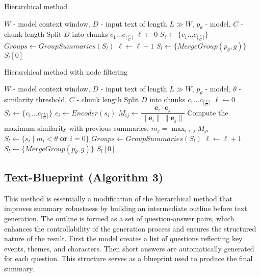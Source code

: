 \documentclass{superfri}
\begin{document}
\noindent
\begin{minipage}[t]{0.49\textwidth}
  \begin{algorithm}[H]
  \caption{Hierarchical method}\label{alg:h}
    \begin{algorithmic}
      \Require $W$ - model context window, $D$ - input text of length $L \gg W$, $p_\theta$ - model, $C$ - chunk length
      \State Split $D$ into chunks $c_1\dots c_{\lceil \frac{L}{C} \rceil}$
      \State $\ell \gets 0$
      \State $S_\ell \gets \{c_1\dots c_{\lceil \frac{L}{C} \rceil}\}$
      \Repeat
        \State $Groups \gets GroupSummaries(S_l)$
        \State $\ell \gets \ell + 1$
          \State $S_l \gets \{MergeGroup(p_\theta,g)\}$
        \EndFor
      \State \Return $S_l[0]$
    \end{algorithmic}
  \end{algorithm}
\end{minipage}\hfill
\begin{minipage}[t]{0.49\textwidth}
  \begin{algorithm}[H]
    \caption{Hierarchical method with node filtering}\label{alg:h_f}
    \begin{algorithmic}
      \Require $W$ - model context window, $D$ - input text of length $L \gg W$, $p_\theta$ - model, $\theta$ - similarity threshold, $C$ - chunk length
      \State Split $D$ into chunks $c_1\dots c_{\lceil \frac{L}{C} \rceil}$
      \State $\ell \gets 0$
      \State $S_\ell \gets \{c_1\dots c_{\lceil \frac{L}{C} \rceil}\}$
      \Repeat
          \State $e_i \gets Encoder(s_i)$
          \State $M_{ij} \gets \dfrac{\mathbf{e}_i\cdot \mathbf{e}_j}{\|\mathbf{e}_i\|\,\|\mathbf{e}_j\|}$
          \State Compute the maximum similarity
        \State with previous summaries.
          \State $m_j=\max_{i<j} M_{ji}$
          \State $S_l \gets \{s_i \mid m_i < \theta$ \textbf{ or } $i = 0 \}$
        \EndFor
        \State $Groups \gets GroupSummaries(S_l)$
        \State $\ell \gets \ell + 1$
          \State $S_l \gets \{MergeGroup(p_\theta,g)\}$
        \EndFor
      \State \Return $S_l[0]$
    \end{algorithmic}
  \end{algorithm}
\end{minipage}

\vspace{0.4em}
\subsection{Text-Blueprint (Algorithm 3)}
This method \cite{blueprint} is essentially a modification of the hierarchical method that improves summary robustness by building an intermediate outline before text generation.
The outline is formed as a set of question-answer pairs, which enhances the controllability of the generation process and ensures the structured nature of the result.
First the model creates a list of questions reflecting key events, themes, and characters. Then short answers are automatically generated for each question.
This structure serves as a blueprint used to produce the final summary.
\end{document}
